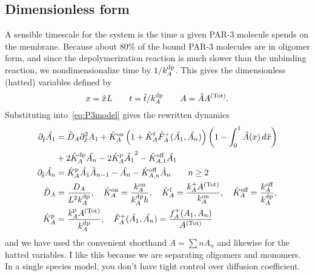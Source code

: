 \documentclass[11pt]{article}
\newcommand{\red}[1]{\color{red}#1\normalcolor}
\newcommand{\6}[1]{#1_{\text{6}}}
\newcommand{\3}[1]{#1_{\text{3}}}
\newcommand{\Tot}[1]{#1^\text{(Tot)}}
\newcommand{\A}[1]{#1_A}
\begin{document}
\subsection{Dimensionless form}
A sensible timescale for the system is the time a given PAR-3 molecule spends on the membrane. Because about 80\% of the bound PAR-3 molecules are in oligomer form, and since the depolymerization reaction is much slower than the unbinding reaction, we nondimensionalize time by $1/\A{\kdp}$. This gives the dimensionless (hatted) variables defined by
\begin{equation*}
x = \hat{x} L \qquad t= \hat{t}/\A{\kdp} \qquad A= \hat{A}\Tot{A}.
\end{equation*}
Substituting into\ \eqref{eq:P3model} gives the rewritten dynamics
\begin{subequations}
\label{eq:PAR3gen}
\begin{align}
\nonumber
\Dthat \hat{\MA} & = \DhatA \Dxhat^2 \MA +\KhatonA \left(1+\KhatfA \hat F_A^+(\hat \MA, \hat \PA) \right)\left(1 - \int_0^1 \hat A(x) \, d\hat{x} \right) \\ 
\label{eq:Amono} &+ 2\KhatdpA \hat{\PA}-2\KhatpA \hat{\MA}^2 - \Khatoff_{A,1} \hat{\MA} \\
\label{eq:Apoly}
\Dthat \hat{\PA} & =\KhatpA \hat{\MA} \hat A_{n-1} - \hat{\PA}-\Khatoff_{A,n}\hat A_n \qquad n \geq 2 \\ 
\label{eq:paramsND}
\DhatA &=\frac{\A{D}}{L^2 \A{\kdp}}, \quad \KhatonA=\frac{\A{\kon}}{\A{\kdp} h }, \quad \KhatfA = \frac{\A{\kf}\Tot{A}}{\A{\kon}}, \quad  \KhatoffA = \frac{\A{\koff}}{\A{\kdp}}, \\ \nonumber \KhatpA &= \frac{\A{\kp} \Tot{A}}{\A{\kdp}},\quad \hat F_A^+(\hat \MA,\hat \PA) =\frac{\A{f}^+(\MA,\PA)}{\Tot{A}}
\end{align}
\end{subequations}
and we have used the convenient shorthand $A=\sum n A_n$ and likewise for the hatted variables. \red{I like this because we are separating oligomers and monomers. In a single species model, you don't have tight control over diffusion coefficient.}
\end{document}
